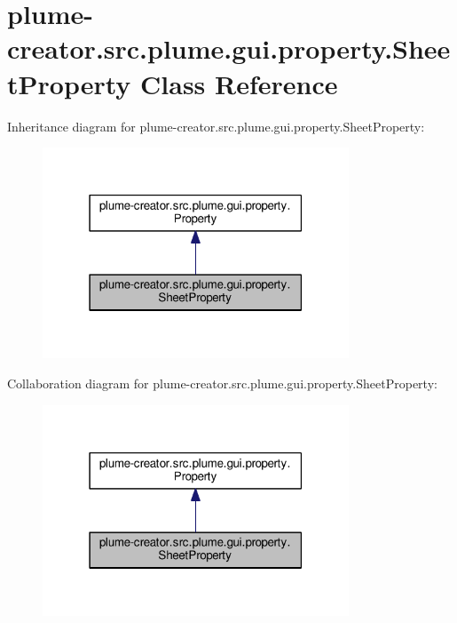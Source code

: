 \hypertarget{classplume-creator_1_1src_1_1plume_1_1gui_1_1property_1_1_sheet_property}{}\section{plume-\/creator.src.\+plume.\+gui.\+property.\+Sheet\+Property Class Reference}
\label{classplume-creator_1_1src_1_1plume_1_1gui_1_1property_1_1_sheet_property}


Inheritance diagram for plume-\/creator.src.\+plume.\+gui.\+property.\+Sheet\+Property\+:\nopagebreak
\begin{figure}[H]
\begin{center}
\leavevmode
\includegraphics[width=259pt]{classplume-creator_1_1src_1_1plume_1_1gui_1_1property_1_1_sheet_property__inherit__graph}
\end{center}
\end{figure}


Collaboration diagram for plume-\/creator.src.\+plume.\+gui.\+property.\+Sheet\+Property\+:\nopagebreak
\begin{figure}[H]
\begin{center}
\leavevmode
\includegraphics[width=259pt]{classplume-creator_1_1src_1_1plume_1_1gui_1_1property_1_1_sheet_property__coll__graph}
\end{center}
\end{figure}
